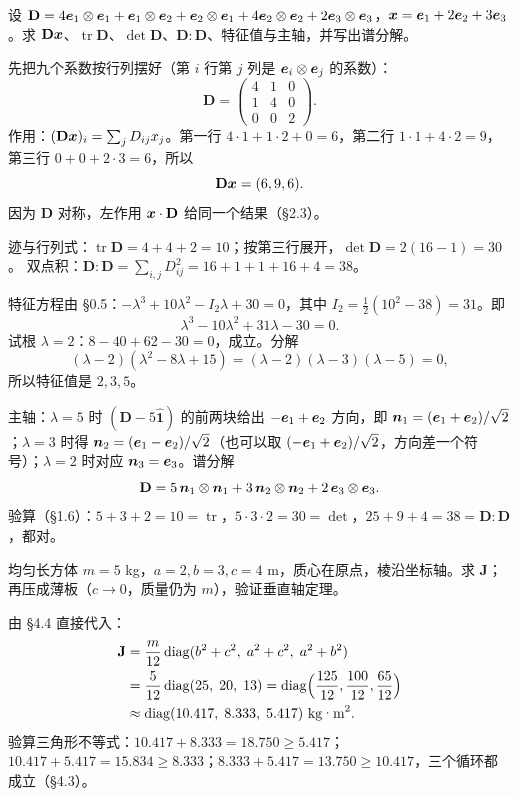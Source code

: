 \documentclass[11pt]{ctexart}
\newcommand{\ten}[1]{\mathbf{#1}}
\newcommand{\unitd}{\hat{\ten{1}}}
\newcommand{\tr}{\operatorname{tr}}
\let\orighdr\hdr
\renewcommand{\hdr}[2]{\par\needspace{5\baselineskip}\orighdr{#1}{#2}}
\begin{document}
\clearpage
\appendix
{}

{设 $\ten D=4\vect e_1\otimes\vect e_1+\vect e_1\otimes\vect e_2+\vect e_2\otimes\vect e_1+4\vect e_2\otimes\vect e_2+2\vect e_3\otimes\vect e_3$，$\boldsymbol{x}=\boldsymbol{e}_1+2\boldsymbol{e}_2+3\boldsymbol{e}_3$。求 $\ten D\vect x$、$\tr\ten D$、$\det\ten D$、$\ten D:\ten D$、特征值与主轴，并写出谱分解。}

先把九个系数按行列摆好（第 $i$ 行第 $j$ 列是 $\boldsymbol{e}_i\otimes\boldsymbol{e}_j$ 的系数）：
\[
\ten D=\begin{pmatrix}4&1&0\\1&4&0\\0&0&2\end{pmatrix}.
\]
作用：$(\ten D\vect x)_i=\sum_jD_{ij}x_j$。第一行 $4\cdot1+1\cdot2+0=6$，第二行 $1\cdot1+4\cdot2=9$，第三行 $0+0+2\cdot3=6$，所以
\[
\ten D\vect x=(6,9,6).
\]
因为 $\ten D$ 对称，左作用 $\vect x\cdot\ten D$ 给同一个结果（§2.3）。

迹与行列式：$\tr\ten D=4+4+2=10$；按第三行展开，$\det\ten D=2(16-1)=30$。
双点积：$\ten D:\ten D=\sum_{i,j}D_{ij}^2=16+1+1+16+4=38$。

特征方程由 §0.5：$-\lambda^3+10\lambda^2-I_2\lambda+30=0$，其中 $I_2=\tfrac12(10^2-38)=31$。即
\[
\lambda^3-10\lambda^2+31\lambda-30=0 .
\]
试根 $\lambda=2$：$8-40+62-30=0$，成立。分解
\[
(\lambda-2)(\lambda^2-8\lambda+15)=(\lambda-2)(\lambda-3)(\lambda-5)=0,
\]
所以特征值是 $2,3,5$。

主轴：$\lambda=5$ 时 $(\ten D-5\unitd)$ 的前两块给出 $-\boldsymbol{e}_1+\boldsymbol{e}_2$ 方向，即 $\boldsymbol{n}_1=(\boldsymbol{e}_1+\boldsymbol{e}_2)/\sqrt2$；$\lambda=3$ 时得 $\boldsymbol{n}_2=(\boldsymbol{e}_1-\boldsymbol{e}_2)/\sqrt2$（也可以取 $(-\boldsymbol{e}_1+\boldsymbol{e}_2)/\sqrt2$，方向差一个符号）；$\lambda=2$ 时对应 $\boldsymbol{n}_3=\boldsymbol{e}_3$。谱分解
\[
\ten D=5\,\vect n_1\otimes\vect n_1+3\,\vect n_2\otimes\vect n_2+2\,\vect e_3\otimes\vect e_3 .
\]
验算（§1.6）：$5+3+2=10=\tr$，$5\cdot3\cdot2=30=\det$，$25+9+4=38=\ten D:\ten D$，都对。

{均匀长方体 $m=5$ kg，$a=2,b=3,c=4$ m，质心在原点，棱沿坐标轴。求 $\ten J$；再压成薄板（$c\to0$，质量仍为 $m$），验证垂直轴定理。}

由 §4.4 直接代入：
\[
\begin{aligned}
\ten J&=\frac{m}{12}\operatorname{diag}(b^2+c^2,\;a^2+c^2,\;a^2+b^2)\\
&=\frac{5}{12}\operatorname{diag}(25,\;20,\;13)
=\operatorname{diag}\Bigl(\frac{125}{12},\frac{100}{12},\frac{65}{12}\Bigr)\\
&\approx\operatorname{diag}(10.417,\;8.333,\;5.417)\ \text{kg·m}^2 .
\end{aligned}
\]
验算三角形不等式：$10.417+8.333=18.750\ge5.417$；$10.417+5.417=15.834\ge8.333$；$8.333+5.417=13.750\ge10.417$，三个循环都成立（§4.3）。
\end{document}
